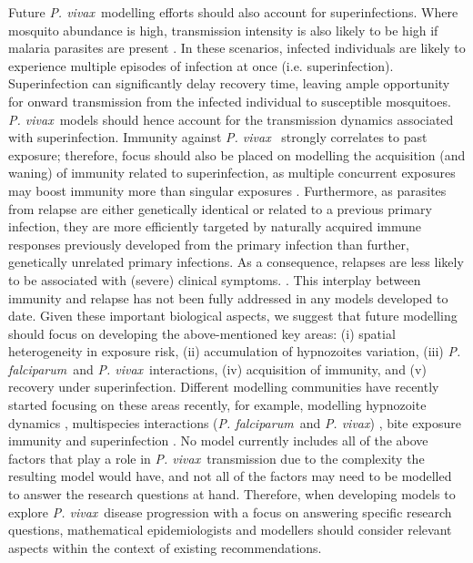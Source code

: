 \documentclass[12pt]{article}
\newcommand{\pv}{\textit{P. vivax}}
\newcommand{\pf}{\textit{P. falciparum}}
\begin{document}
Future \pv~modelling efforts should also account for superinfections. Where mosquito abundance is high, transmission intensity is also likely to be high if malaria parasites are present \cite{portugal2011superinfection,bashar2014seasonal,reimer2016malaria,keven2022vector}. In these scenarios, infected individuals are likely to experience multiple episodes of infection at once (i.e. superinfection). Superinfection can significantly delay recovery time, leaving ample opportunity for onward transmission from the infected individual to susceptible mosquitoes. \pv~models should hence account for the transmission dynamics associated with superinfection.  Immunity against \pv~ strongly correlates to past exposure; therefore, focus should also be placed on modelling the acquisition (and waning) of immunity related to superinfection, as multiple concurrent exposures may boost immunity more than singular exposures \cite{thesis_somya,white2018mathematical}. Furthermore, as parasites from relapse are either genetically identical or related to a previous primary infection, they are more efficiently targeted by naturally acquired immune responses previously developed from the primary infection than further, genetically unrelated primary infections. As a consequence, relapses are less likely to be associated with (severe) clinical symptoms.  \cite{white2011determinants,joyner2019humoral}. This interplay between immunity and relapse has not been fully addressed in any models developed to date. Given these important biological aspects, we suggest that future modelling should focus on developing the above-mentioned key areas: (i) spatial heterogeneity in exposure risk, (ii)  accumulation of hypnozoites variation, (iii) \pf~and \pv~interactions, (iv) acquisition of immunity, and (v) recovery under superinfection. Different modelling communities have recently started focusing on these areas recently, for example, modelling hypnozoite dynamics \cite{mehra2020activation,mehra2022hypnozoite}, multispecies interactions (\pf~and \pv) \cite{silal2019malaria,walker2023model}, bite exposure immunity \cite{white2018mathematical} and superinfection \cite{mehra2022hypnozoite,thesis_somya,anwar2023optimal}. No model currently includes all of the above factors that play a role in \pv~transmission due to the complexity the resulting model would have, and not all of the factors may need to be modelled to answer the research questions at hand. Therefore, when developing models to explore \pv~disease progression with a focus on answering specific research questions, mathematical epidemiologists and modellers should consider relevant aspects within the context of existing recommendations. 
\end{document}
